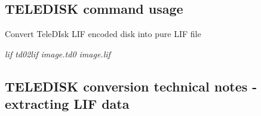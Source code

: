 \subsection*{T\+E\+L\+E\+D\+I\+SK command usage}


\begin{DoxyItemize}
\item Convert Tele\+D\+Isk L\+IF encoded disk into pure L\+IF file
\begin{DoxyItemize}
\item {\itshape lif td02lif image.\+td0 image.\+lif}
\end{DoxyItemize}
\end{DoxyItemize}

\subsection*{T\+E\+L\+E\+D\+I\+SK conversion technical notes -\/ extracting L\+IF data}


